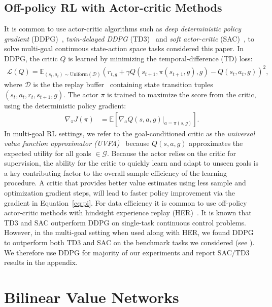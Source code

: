 \documentclass[dvipsnames]{article} %
\theoremstyle{definition}
\theoremstyle{remark}
\begin{document}
\subsection{Off-policy RL with Actor-critic Methods}
\label{sec:offpolicy}
It is common to use actor-critic algorithms such as \textit{deep deterministic policy gradient} (DDPG)~\citep{Silver2014deterministic}, \textit{twin-delayed DDPG} (TD3)~\citep{Fujimoto2018td3} and \textit{soft actor-critic} (SAC)~\citep{haarnoja2018soft}, to solve multi-goal continuous state-action space tasks considered this paper. In DDPG, the critic \(Q\) is learned by minimizing the temporal-difference (TD) loss:
\begin{align}
    \mathcal L(Q) = \mathbb{E}_{(s_t,a_t) \sim \text{Uniform}(\mathcal{D})}(r_{t,g} + \gamma Q(s_{t+1}, \pi(s_{t+1}, g), g) - Q(s_t, a_t, g))^2,
\end{align}
where $\mathcal{D}$ is the the replay buffer~\citep{mnih2015human} containing state transition tuples $(s_t,a_t,r_t,s_{t+1},g)$. The actor $\pi$ is trained to maximize the score from the critic, using the deterministic policy gradient:
\begin{align}\label{eq:pi}
    \nabla_\pi J(\pi) &= \mathbb{E} [\nabla_a Q(s, a, g) \vert_{a = \pi(s, g)}].
\end{align}
In multi-goal RL settings, we refer to the goal-conditioned critic as the \textit{universal value function approximator (UVFA)}~\citep{Schaul2015UVFA} because $Q(s, a, g)$ approximates the expected utility for all goals \(\in \mathcal G\). Because the actor relies on the critic for supervision, the ability for the critic to quickly learn and adapt to unseen goals is a key contributing factor to the overall sample efficiency of the learning procedure. A critic that provides better value estimates using less sample and optimization gradient steps, will lead to faster policy improvement via the gradient in Equation~\ref{eq:pi}. For data efficiency it is common to use off-policy actor-critic methods with hindsight experience replay (HER)~\citep{Andrychowicz2017her}. It is known that
TD3 and SAC outperform DDPG on single-task continuous control problems. However, in the multi-goal setting when used along with HER, we found DDPG to outperform both TD3 and SAC on the benchmark tasks we considered (see ). We therefore use DDPG for majority of our experiments and report SAC/TD3 results in the appendix. 

\section{Bilinear Value Networks}
\label{sec:bilinear-value-networks}
\end{document}
